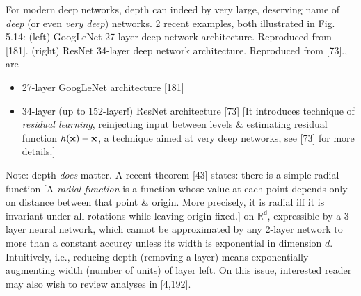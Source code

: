 \documentclass{article}
\begin{document}
\begin{itemize}
\begin{itemize}
\begin{itemize}
			For modern deep networks, depth can indeed by very large, deserving name of {\it deep} (or even {\it very deep}) networks. 2 recent examples, both illustrated in {\sf Fig. 5.14: (left) GoogLeNet 27-layer deep network architecture. Reproduced from [181]. (right) ResNet 34-layer deep network architecture. Reproduced from [73].}, are
			\begin{itemize}
				\item 27-layer GoogLeNet architecture [181]
				\item 34-layer (up to 152-layer!) ResNet architecture [73] [It introduces technique of {\it residual learning}, reinjecting input between levels \& estimating residual function $h({\bf x}) - {\bf x}$, a technique aimed at very deep networks, see [73] for more details.]
			\end{itemize}
			Note: depth {\it does} matter. A recent theorem [43] states: there is a simple radial function [A {\it radial function} is a function whose value at each point depends only on distance between that point \& origin. More precisely, it is radial iff it is invariant under all rotations while leaving origin fixed.] on $\mathbb{R^d}$, expressible by a 3-layer neural network, which cannot be approximated by any 2-layer network to more than a constant accurcy unless its width is exponential in dimension $d$. Intuitively, i.e., reducing depth (removing a layer) means exponentially augmenting width (number of units) of layer left. On this issue, interested reader may also wish to review analyses in [4,192].


\end{itemize}
\end{itemize}
\end{itemize}
\end{document}
